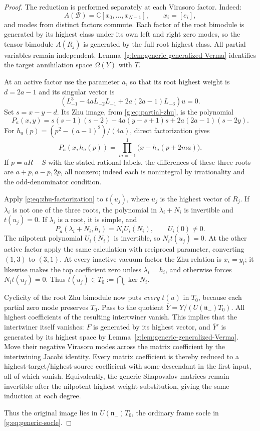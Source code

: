 \documentclass[11pt,a4paper]{article}
\numberwithin{equation}{section}
\theoremstyle{definition}\newtheorem{definition}[theorem]{Definition}
\theoremstyle{remark}\newtheorem{remark}[theorem]{Remark}
\begin{document}
\begin{proof}
The reduction is performed separately at each Virasoro factor.
Indeed:
\[
 A(\mathcal B)=\mathbb C[x_0,\ldots,x_{N-1}],\qquad x_i=[e_i],
\]
and modes from distinct factors commute.  Each factor of the root
bimodule is generated by its highest class under its own left and
right zero modes, so the tensor bimodule $A(R_j)$ is generated by
the full root highest class.  All partial variables remain
independent.  Lemma~\ref{g:lem:generic-generalized-Verma} identifies
the target annihilation space $\Omega(Y)$ with $T$.

At an active factor use the parameter $a$, so that its root highest
weight is $d=2a-1$ and its singular vector is
\[
 (L_{-1}^3-4aL_{-2}L_{-1}+2a(2a-1)L_{-3})u=0.
\]
Set $s=x-y-d$.  Its Zhu image, from \eqref{g:eq:partial-zhu}, is the polynomial
\begin{equation}
 P_a(x,y)=s(s-1)(s-2)-4a(y-s+1)s
                      +2a(2a-1)(s-2y).              \label{g:eq:zhu-cubic}
\end{equation}
For $h_a(p)=(p^2-(a-1)^2)/(4a)$, direct factorization gives
\begin{equation}
 P_a(x,h_a(p))
   =\prod_{m=-1}^1\bigl(x-h_a(p+2ma)\bigr).         \label{g:eq:zhu-factorization}
\end{equation}
If $p=aR-S$ with the stated rational labels, the differences of
these three roots are $a+p,a-p,2p$, all nonzero; indeed each is
nonintegral by irrationality and the odd-denominator condition.

Apply \eqref{g:eq:zhu-factorization} to $t(u_j)$, where $u_j$ is the highest vector of $R_j$.
If $\lambda_i$ is not one of the three roots, the polynomial in
$\lambda_i+N_i$ is invertible and $t(u_j)=0$.  If $\lambda_i$ is
a root, it is simple, and
\[
 P_a(\lambda_i+N_i,h_i)=N_i U_i(N_i),\qquad U_i(0)\ne0.
\]
The nilpotent polynomial $U_i(N_i)$ is invertible, so
$N_i t(u_j)=0$.  At the other active factor apply the same
calculation with reciprocal parameter, converting $(1,3)$ to
$(3,1)$.  At every inactive vacuum factor the Zhu relation is
$x_i=y_i$; it likewise makes the top coefficient zero unless
$\lambda_i=h_i$, and otherwise forces $N_it(u_j)=0$.
Thus $t(u_j)\in T_0:=\bigcap_i\ker N_i$.

Cyclicity of the root Zhu bimodule now puts \emph{every} $t(u)$ in
$T_0$, because each partial zero mode preserves $T_0$.  Pass to the
quotient $\overline Y=Y/(U(\mathfrak n_-)T_0)$.  All highest
coefficients of the resulting intertwiner vanish.  This implies that
the intertwiner itself vanishes: $F$ is generated by its highest
vector, and $\overline Y'$ is generated by its highest space by
Lemma~\ref{g:lem:generic-generalized-Verma}.  Move their negative
Virasoro modes across the matrix coefficient by the intertwining
Jacobi identity.  Every matrix coefficient is thereby reduced to a
highest-target/highest-source coefficient with some descendant in
the first input, all of which vanish.  Equivalently, the generic
Shapovalov matrices remain invertible after the nilpotent highest
weight substitution, giving the same induction at each degree.

Thus the original image lies in $U(\mathfrak n_-)T_0$, the ordinary
frame socle in \eqref{g:eq:generic-socle}.
\end{proof}
\end{document}
